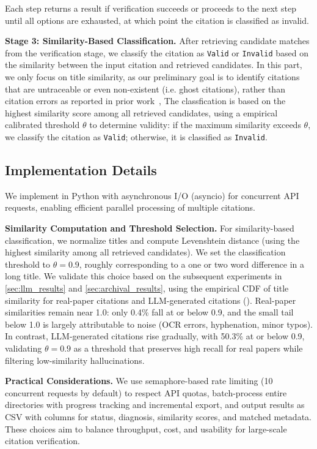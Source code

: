 Each step returns a result if verification succeeds or proceeds to the next step until all options are exhausted, at which point the citation is classified as invalid.

\noindent\textbf{Stage 3: Similarity-Based Classification.}
After retrieving candidate matches from the verification stage, we classify the citation as \texttt{Valid} or \texttt{Invalid} based on the similarity between the input citation and retrieved candidates.
In this part, we only focus on title similarity, as our preliminary goal is to identify citations that are untraceable or even non-existent (i.e. ghost citations), rather than citation errors as reported in prior work~\cite{simkin2005stochastic, simkin2003read},
The classfication is based on the highest similarity score among all retrieved candidates, using a empirical calibrated threshold $\theta$ to determine validity: if the maximum similarity exceeds $\theta$, we classify the citation as \texttt{Valid}; otherwise, it is classified as \texttt{Invalid}.

\subsection{Implementation Details}
We implement \citeb in Python with asynchronous I/O (asyncio) for concurrent API requests, enabling efficient parallel processing of multiple citations.

\noindent\textbf{Similarity Computation and Threshold Selection.}
For similarity-based classification, we normalize titles and compute Levenshtein distance\cite{levenshtein1966binary} (using the highest similarity among all retrieved candidates).
We set the classification threshold to $\theta = 0.9$, roughly corresponding to a one or two word difference in a long title.
We validate this choice based on the subsequent experiments in \cref{sec:llm_results} and \cref{sec:archival_results}, using the empirical CDF of title similarity for real-paper citations and LLM-generated citations ().
Real-paper similarities remain near 1.0: only 0.4\% fall at or below 0.9, and the small tail below 1.0 is largely attributable to noise (OCR errors, hyphenation, minor typos).
In contrast, LLM-generated citations rise gradually, with 50.3\% at or below 0.9, validating $\theta = 0.9$ as a threshold that preserves high recall for real papers while filtering low-similarity hallucinations.


\noindent\textbf{Practical Considerations.}
We use semaphore-based rate limiting (10 concurrent requests by default) to respect API quotas, batch-process entire directories with progress tracking and incremental export, and output results as CSV with columns for status, diagnosis, similarity scores, and matched metadata.
These choices aim to balance throughput, cost, and usability for large-scale citation verification.



